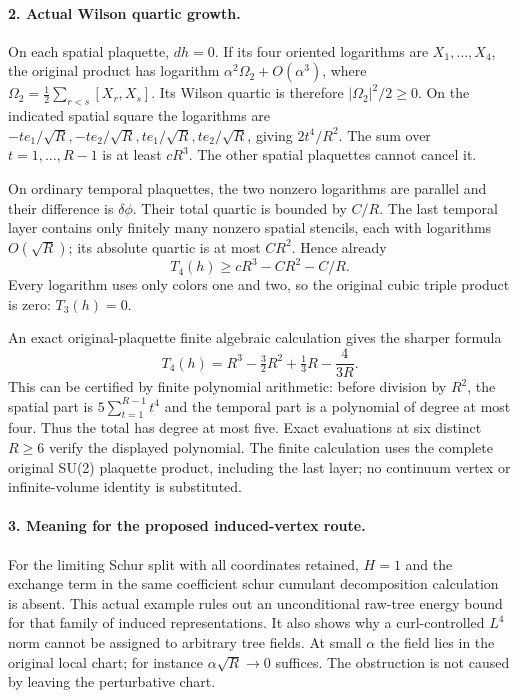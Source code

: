 \documentclass[11pt]{article}
\begin{document}
\paragraph{2. Actual Wilson quartic growth.}
On each spatial plaquette, $dh=0$. If its four oriented logarithms
are $X_1,\ldots,X_4$, the original product has logarithm
$\alpha^2\Omega_2+O(\alpha^3)$, where
$\Omega_2=\frac12\sum_{r<s}[X_r,X_s]$.
Its Wilson quartic is therefore $|\Omega_2|^2/2\ge0$.
On the indicated spatial square the logarithms are
$-t e_1/\sqrt R,-t e_2/\sqrt R,t e_1/\sqrt R,t e_2/\sqrt R$,
giving $2t^4/R^2$. The sum over $t=1,\ldots,R-1$ is at least
$cR^3$. The other spatial plaquettes cannot cancel it.

On ordinary temporal plaquettes, the two nonzero logarithms are
parallel and their difference is $\delta\phi$. Their total quartic
is bounded by $C/R$. The last temporal layer contains only finitely
many nonzero spatial stencils, each with logarithms $O(\sqrt R)$;
its absolute quartic is at most $CR^2$. Hence already
\[
 T_4(h)\ge cR^3-CR^2-C/R.                                  \tag{3}
\]
Every logarithm uses only colors one and two, so the original cubic
triple product is zero: $T_3(h)=0$.

An exact original-plaquette finite algebraic calculation gives the sharper formula
\[
 T_4(h)=R^3-\tfrac32R^2+\tfrac13R-\frac4{3R}.                \tag{4}
\]
This can be certified by finite polynomial arithmetic: before division
by $R^2$, the spatial part is $5\sum_{t=1}^{R-1}t^4$ and the temporal
part is a polynomial of degree at most four. Thus the total has degree
at most five. Exact evaluations at six distinct $R\ge6$ verify the
displayed polynomial. The finite calculation uses the complete original SU(2)
plaquette product, including the last layer; no continuum vertex or
infinite-volume identity is substituted.

\paragraph{3. Meaning for the proposed induced-vertex route.}
For the limiting Schur split with all coordinates retained, $H=1$
and the exchange term in the same coefficient schur cumulant decomposition calculation is absent. This actual example rules out
an unconditional raw-tree energy bound for that family of induced
representations. It also shows why a curl-controlled $L^4$ norm cannot
be assigned to arbitrary tree fields. At small $\alpha$ the field lies
in the original local chart; for instance $\alpha\sqrt R\to0$ suffices.
The obstruction is not caused by leaving the perturbative chart.
\end{document}
